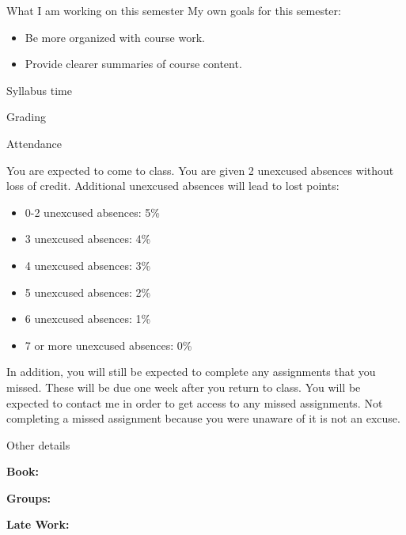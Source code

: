 \documentclass[]{beamer}
\begin{document}
\begin{frame}{What I am working on this semester}
My own goals for this semester:
\begin{itemize}
	\item Be more organized with course work. 
	\item Provide clearer summaries of course content. 
\end{itemize}
\end{frame}


\begin{frame}

\centering 
\LARGE Syllabus time

\end{frame}


\begin{frame}{Grading}

\end{frame}



\begin{frame}{Attendance}

You are expected to come to class. You are given 2 unexcused absences without loss of credit. Additional unexcused absences will lead to lost points:
\begin{itemize}
	\item 0-2 unexcused absences: 5\% 
	\item 3 unexcused absences: 4\% 
	\item 4 unexcused absences: 3\% 
	\item 5 unexcused absences: 2\% 
	\item 6 unexcused absences: 1\% 
	\item 7 or more unexcused absences: 0\% 
\end{itemize}
In addition, you will still be expected to complete any assignments that you missed. These will be due one week after you return to class. You will be expected to contact me in order to get access to any missed assignments. Not completing a missed assignment because you were unaware of it is not an excuse.


\end{frame}




\begin{frame}{Other details}

\textbf{Book:} 


\textbf{Groups:}


\textbf{Late Work:}



\end{frame}
\end{document}
